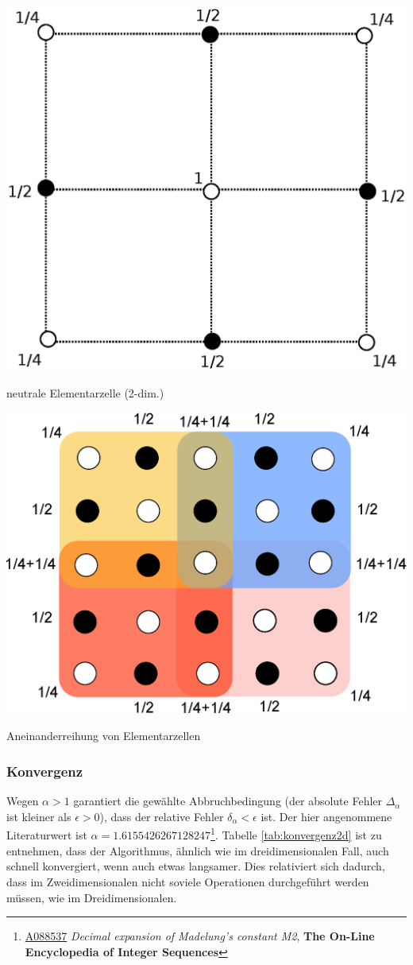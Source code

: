 \documentclass[10pt,a4paper]{article}
\begin{document}
\vspace{\baselineskip}
\begin{minipage}[c]{0.5\textwidth}
\captionsetup{type=figure}
\begin{center}
\includegraphics[height=0.45\textwidth]{./figures/quadrat.eps}
\caption{neutrale Elementarzelle (2-dim.)}
\label{skalierungsgrafik2d}
\end{center}
\end{minipage}
\begin{minipage}[c]{0.45\textwidth}
\captionsetup{type=figure}
\begin{center}
\includegraphics[height=0.5\textwidth]{./figures/elementarzelle.eps}
\caption{Aneinanderreihung von Elementarzellen}
\label{zellensumme}
\end{center}
\end{minipage}	
\subsubsection{Konvergenz}

Wegen $\alpha > 1$ garantiert die gewählte Abbruchbedingung (der absolute Fehler $\Delta_\alpha$ ist kleiner als $\epsilon > 0$), 
dass der relative Fehler $\delta_\alpha < \epsilon$ ist. Der hier angenommene Literaturwert ist $\alpha = 1.6155426267128247$\footnote{\href{https://oeis.org/A088537}{A088537} \emph{Decimal expansion of Madelung's constant M2}, \textbf{The On-Line Encyclopedia of Integer Sequences}}. Tabelle \ref{tab:konvergenz2d} ist zu entnehmen, dass der Algorithmus, ähnlich wie im dreidimensionalen Fall, auch schnell konvergiert, wenn auch etwas langsamer. Dies relativiert sich dadurch, dass im Zweidimensionalen
nicht soviele Operationen durchgeführt werden müssen, wie im Dreidimensionalen.
\end{document}
